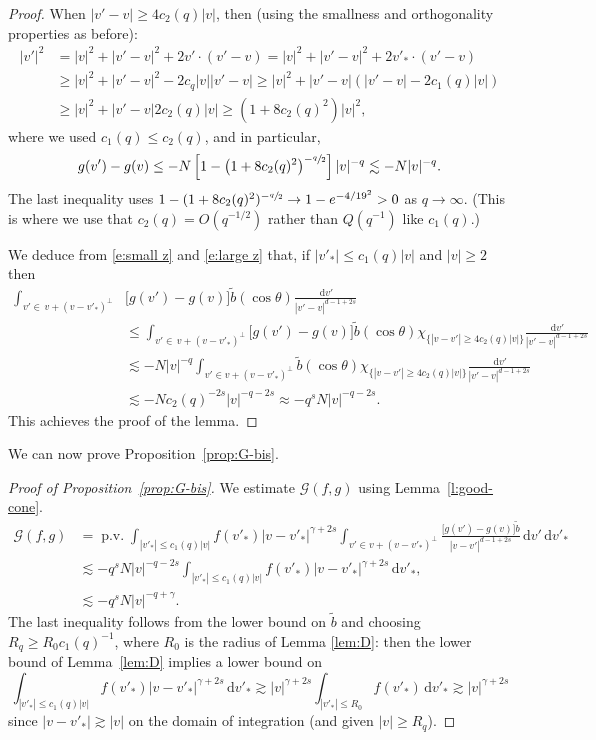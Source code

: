 \documentclass[JEP,XML,SOM,Unicode,NoFloatCountersInSection]{cedram}
\theoremstyle{plain}
\theoremstyle{definition}
\numberwithin{equation}{section}
\newcommand{\dd} {\, \mathrm{d}}
\DeclareMathOperator{\PV}{p.v.}
\let\A N
\begin{document}
\begin{proof}
When $|v'-v| \ge 4 c_2(q)|v|$, then (using the smallness and orthogonality
properties as before):
\begin{align*}
|v'|^2 & = |v|^2 + |v'-v|^2 + 2 v'\cdot (v'-v) = |v|^2 + |v'-v|^2 + 2
v'_* \cdot (v'-v)\\
& \ge |v|^2 + |v'-v|^2 -2c_q |v||v'-v| \ge |v|^2 + |v'-v|
\left( |v'-v| -2c_1(q) |v| \right) \\
& \ge |v|^2 + |v'-v| 2c_2(q) |v| \ge (1 + 8 c_2(q)^2) |v|^2,
\end{align*}
where we used $c_1(q) \le c_2(q)$, and in particular,
\begin{equation}\label{e:large z}
g(v') - g(v) \le - \A \left[1-\left(1+8c_2(q)^2\right)^{-\sfrac{q}2}
\right]|v|^{-q} \lesssim -\A |v|^{-q}.
\end{equation}
The last inequality uses $1 - (1+8 c_2(q)^2)^{-\sfrac{q}2} \to 1 - e^{-4/19^2} >0$
as $q \to \infty$. (This is where we use that $c_2(q) = O(q^{-1/2})$
rather than $Q(q^{-1})$ like $c_1(q)$.)

We deduce from \eqref{e:small z} and \eqref{e:large z} that, if
$|v'_*| \le c_1(q) |v|$ and $|v| \ge 2$ then
\begin{align*}
\int_{v' \in \, v + (v-v'_*)^\bot}& \big[ g(v') - g(v) \big] \tilde
b(\cos \theta) \frac{\dd v'}{|v'-v|^{d-1+2s}} \\
& \le \int_{v' \in \, v + (v-v'_*)^\bot} \big[ g(v') - g(v) \big] \tilde
b(\cos \theta) \chi_{\{|v-v'| \ge 4c_2(q) |v|\}} \frac{\dd v'}{|v'-v|^{d-1+2s}} \\
& \lesssim - \A |v|^{-q} \int_{v' \in v + (v-v'_*)^\bot} \tilde
b(\cos \theta) \chi_{\{|v-v'| \ge 4c_2(q) |v|\}} \frac{\dd v'}{|v'-v|^{d-1+2s}} \\
& \lesssim - \A c_2(q)^{-2s}|v|^{-q-2s} \approx -q^s \A |v|^{-q-2s}.
\end{align*}
This achieves the proof of the lemma.
\end{proof}
We can now prove Proposition~\ref{prop:G-bis}.

\begin{proof}[Proof of Proposition~\ref{prop:G-bis}]
We estimate $\mathcal G(f,g)$ using Lemma~\ref{l:good-cone}.
\begin{align*}
\mathcal{G} (f,g) & = \PV \int_{|v'_*| \le c_1(q) |v|} f(v'_*)
|v-v'_*|^{\gamma+2s} \int_{v' \in v +
(v-v'_*)^\bot}
\frac{\big[ g(v')-g(v) \big] \tilde b}{|v-v'|^{d-1+2s}}
\dd v' \dd v'_* \\
&\lesssim - q^{s} \A |v|^{-q-2s} \int_{|v'_*| \le c_1(q) |v|} f(v'_*) |v-v'_*|^{\gamma+2s} \dd v'_*, \\
&\lesssim - q^{s} \A |v|^{-q+\gamma}.
\end{align*}
The last inequality follows from the lower bound on $\tilde b$ and
choosing $R_q \ge R_0 c_1(q)^{-1}$, where $R_0$ is the radius of Lemma
\ref{lem:D}: then the lower bound of Lemma~\ref{lem:D} implies a lower
bound on
\[
\int_{|v'_*| \le c_1(q) |v|} f(v'_*) |v-v'_*|^{\gamma+2s} \dd v'_* \gtrsim
|v|^{\gamma+2s} \int_{|v'_*| \le R_0} f(v'_*) \dd v'_* \gtrsim |v|^{\gamma+2s}
\]
since $|v-v'_*| \gtrsim |v|$ on the domain of integration (and given
$|v| \ge R_q$).
\end{proof}
\end{document}
